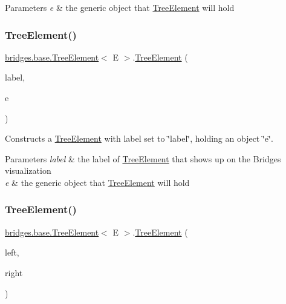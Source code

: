 \begin{DoxyParams}{Parameters}
{\em e} & the generic object that \hyperlink{classbridges_1_1base_1_1_tree_element}{Tree\+Element} will hold \\
\hline
\end{DoxyParams}
\hypertarget{classbridges_1_1base_1_1_tree_element_a476cbeedf2c56f6a40a632035b7d740e}{}\label{classbridges_1_1base_1_1_tree_element_a476cbeedf2c56f6a40a632035b7d740e} 
\subsubsection{\texorpdfstring{Tree\+Element()}{TreeElement()}\hspace{0.1cm}{\footnotesize\ttfamily [3/5]}}
{\footnotesize\ttfamily \hyperlink{classbridges_1_1base_1_1_tree_element}{bridges.\+base.\+Tree\+Element}$<$ E $>$.\hyperlink{classbridges_1_1base_1_1_tree_element}{Tree\+Element} (\begin{DoxyParamCaption}\item[{String}]{label,  }\item[{E}]{e }\end{DoxyParamCaption})}

Constructs a \hyperlink{classbridges_1_1base_1_1_tree_element}{Tree\+Element} with label set to \char`\"{}label\char`\"{}, holding an object \char`\"{}e\char`\"{}. 
\begin{DoxyParams}{Parameters}
{\em label} & the label of \hyperlink{classbridges_1_1base_1_1_tree_element}{Tree\+Element} that shows up on the Bridges visualization \\
\hline
{\em e} & the generic object that \hyperlink{classbridges_1_1base_1_1_tree_element}{Tree\+Element} will hold \\
\hline
\end{DoxyParams}
\hypertarget{classbridges_1_1base_1_1_tree_element_aae24dfde287dc0596c69ad853f12f72e}{}\label{classbridges_1_1base_1_1_tree_element_aae24dfde287dc0596c69ad853f12f72e} 
\subsubsection{\texorpdfstring{Tree\+Element()}{TreeElement()}\hspace{0.1cm}{\footnotesize\ttfamily [4/5]}}
{\footnotesize\ttfamily \hyperlink{classbridges_1_1base_1_1_tree_element}{bridges.\+base.\+Tree\+Element}$<$ E $>$.\hyperlink{classbridges_1_1base_1_1_tree_element}{Tree\+Element} (\begin{DoxyParamCaption}\item[{\hyperlink{classbridges_1_1base_1_1_tree_element}{Tree\+Element}$<$ E $>$}]{left,  }\item[{\hyperlink{classbridges_1_1base_1_1_tree_element}{Tree\+Element}$<$ E $>$}]{right }\end{DoxyParamCaption})}

